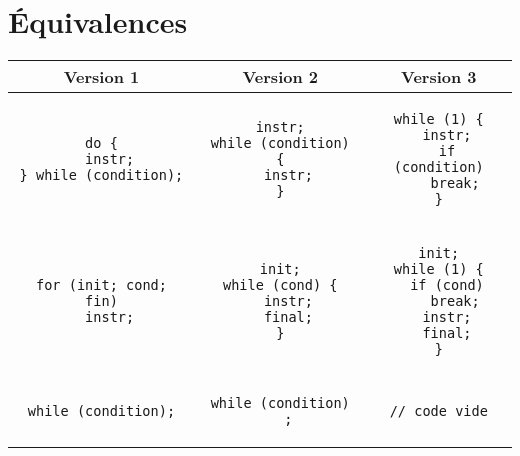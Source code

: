 \documentclass[a4paper,10pt]{article}
\begin{document}
  \section{Équivalences}
  \begin{tabular}{c|c|c}
    Version 1 & Version 2 & Version 3\\
    \hline
    \begin{minipage}[t]{4cm}
      \begin{verbatim}
do {
  instr;
} while (condition);
      \end{verbatim}
    \end{minipage} &
    \begin{minipage}[t]{4cm}
      \begin{verbatim}
instr;
while (condition) {
  instr;
}
      \end{verbatim}
    \end{minipage} &
    \begin{minipage}[t]{4cm}
      \begin{verbatim}
while (1) {
  instr;
  if (condition)
    break;
}
      \end{verbatim}
    \end{minipage}\\
    \hline
    \begin{minipage}[t]{4cm}
      \begin{verbatim}
for (init; cond; fin)
  instr;
      \end{verbatim}
    \end{minipage} &
    \begin{minipage}[t]{4cm}
      \begin{verbatim}
init;
while (cond) {
  instr;
  final;
}
      \end{verbatim}
    \end{minipage} &
    \begin{minipage}[t]{4cm}
      \begin{verbatim}
init;
while (1) {
  if (cond)
    break;
  instr;
  final;
}
      \end{verbatim}
    \end{minipage}\\
    \hline
    \begin{minipage}[t]{4cm}
      \begin{verbatim}
while (condition);
      \end{verbatim}
    \end{minipage} &
    \begin{minipage}[t]{4cm}
      \begin{verbatim}
while (condition)
  ;
      \end{verbatim}
    \end{minipage} &
    \begin{minipage}[t]{4cm}
      \begin{verbatim}
// code vide
      \end{verbatim}
    \end{minipage}
  \end{tabular}
\end{document}
